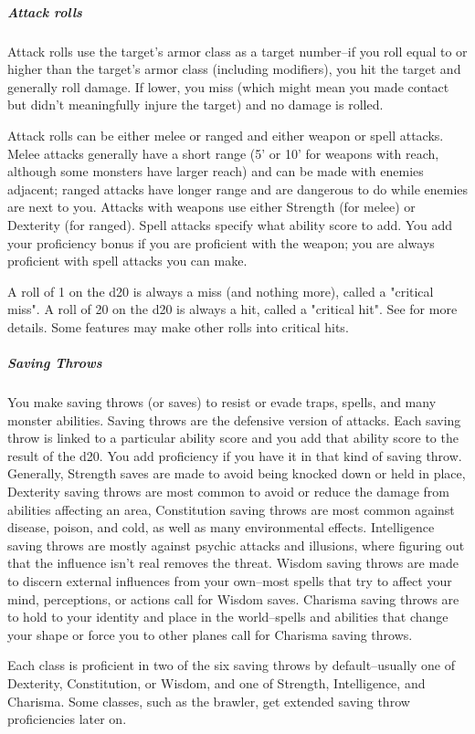 \subparagraph*{Attack rolls} Attack rolls use the target's armor class as a target number--if you roll equal to or higher than the target's armor class (including modifiers), you hit the target and generally roll damage. If lower, you miss (which might mean you made contact but didn't meaningfully injure the target) and no damage is rolled.

Attack rolls can be either melee or ranged and either weapon or spell attacks. Melee attacks generally have a short range (5' or 10' for weapons with reach, although some monsters have larger reach) and can be made with enemies adjacent; ranged attacks have longer range and are dangerous to do while enemies are next to you. Attacks with weapons use either Strength (for melee) or Dexterity (for ranged). Spell attacks specify what ability score to add. You add your proficiency bonus if you are proficient with the weapon; you are always proficient with spell attacks you can make.

A roll of 1 on the d20 is always a miss (and nothing more), called a "critical miss". A roll of 20 on the d20 is always a hit, called a "critical hit". See  for more details. Some features may make other rolls into critical hits.

\subparagraph*{Saving Throws} You make saving throws (or saves) to resist or evade traps, spells, and many monster abilities. Saving throws are the defensive version of attacks. Each saving throw is linked to a particular ability score and you add that ability score to the result of the d20. You add proficiency if you have it in that kind of saving throw. Generally, Strength saves are made to avoid being knocked down or held in place, Dexterity saving throws are most common to avoid or reduce the damage from abilities affecting an area, Constitution saving throws are most common against disease, poison, and cold, as well as many environmental effects. Intelligence saving throws are mostly against psychic attacks and illusions, where figuring out that the influence isn't real removes the threat. Wisdom saving throws are made to discern external influences from your own--most spells that try to affect your mind, perceptions, or actions call for Wisdom saves. Charisma saving throws are to hold to your identity and place in the world--spells and abilities that change your shape or force you to other planes call for Charisma saving throws.

Each class is proficient in two of the six saving throws by default--usually one of Dexterity, Constitution, or Wisdom, and one of Strength, Intelligence, and Charisma. Some classes, such as the brawler, get extended saving throw proficiencies later on.

